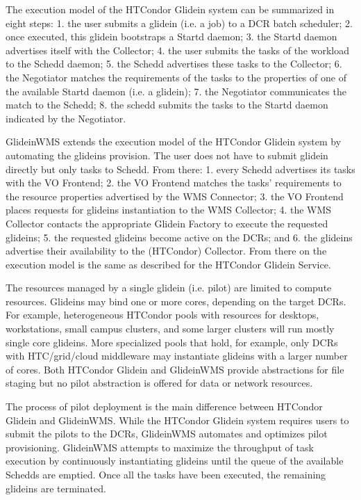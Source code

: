 \documentclass{sig-alternate}
\begin{document}
The execution model of the HTCondor Glidein system can be summarized in eight
steps: 1. the user submits a glidein (i.e. a job) to a DCR batch scheduler; 2.
once executed, this glidein bootstraps a Startd daemon; 3. the Startd daemon
advertises itself with the Collector; 4. the user submits the tasks of the
workload to the Schedd daemon; 5. the Schedd advertises these tasks to the
Collector; 6. the Negotiator matches the requirements of the tasks to the
properties of one of the available Startd daemon (i.e. a glidein); 7. the
Negotiator communicates the match to the Schedd; 8. the schedd submits the tasks
to the Startd daemon indicated by the Negotiator.

GlideinWMS extends the execution model of the HTCondor Glidein system by
automating the glideins provision. The user does not have to submit glidein
directly but only tasks to Schedd. From there: 1. every Schedd advertises its
tasks with the VO Frontend; 2. the VO Frontend matches the tasks' requirements
to the resource properties advertised by the WMS Connector; 3. the VO Frontend
places requests for glideins instantiation to the WMS Collector; 4. the WMS
Collector contacts the appropriate Glidein Factory to execute the requested
glideins; 5. the requested glideins become active on the DCRs; and 6. the
glideins advertise their availability to the (HTCondor) Collector. From there
on the execution model is the same as described for the HTCondor Glidein
Service.


The resources managed by a single glidein (i.e. pilot) are limited to compute
resources. Glideins may bind one or more cores, depending on the target DCRs.
For example, heterogeneous HTCondor pools with resources for desktops,
workstations, small campus clusters, and some larger clusters will run mostly
single core glideins. More specialized pools that hold, for example, only DCRs
with HTC/grid/cloud middleware may instantiate glideins with a larger number of
cores. Both HTCondor Glidein and GlideinWMS provide abstractions for file
staging but no pilot abstraction is offered for data or network resources.

The process of pilot deployment is the main difference between HTCondor Glidein
and GlideinWMS. While the HTCondor Glidein system requires users to submit the
pilots to the DCRs, GlideinWMS automates and optimizes pilot provisioning.
GlideinWMS attempts to maximize the throughput of task execution by continuously
instantiating glideins until the queue of the available Schedds are
emptied. Once all the tasks have been executed, the remaining glideins are
terminated.
\end{document}

